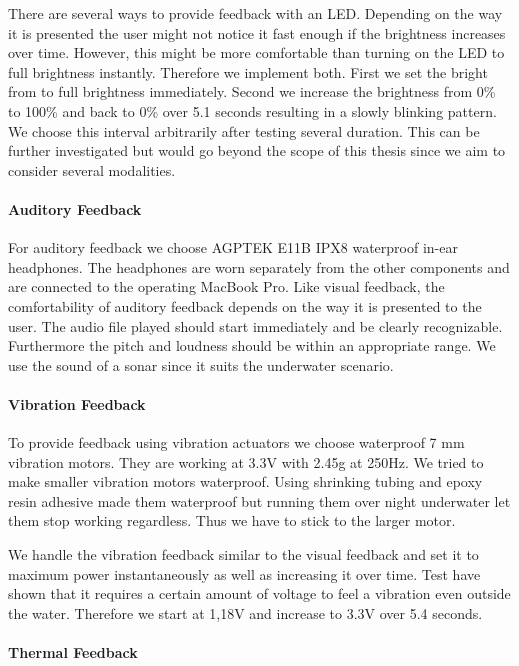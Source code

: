 There are several ways to provide feedback with an LED.
Depending on the way it is presented the user might not notice it fast enough if the brightness increases over time.
However, this might be more comfortable than turning on the LED to full brightness instantly.
Therefore we implement both.
First we set the bright from to full brightness immediately.
Second we increase the brightness from 0\% to 100\%  and back to 0\% over 5.1 seconds resulting in a slowly blinking pattern.
We choose this interval arbitrarily after testing several duration.
This can be further investigated but would go beyond the scope of this thesis since we aim to consider several modalities.


\paragraph{Auditory Feedback}

For auditory feedback we choose AGPTEK E11B IPX8 waterproof in-ear headphones.
The headphones are worn separately from the other components and are connected to the operating MacBook Pro.
Like visual feedback, the comfortability of auditory feedback depends on the way it is presented to the user. 
The audio file played should start immediately and be clearly recognizable.
Furthermore the pitch and loudness should be within an appropriate range.
We use the sound of a sonar since it suits the underwater scenario.


\paragraph{Vibration Feedback}

To provide feedback using vibration actuators we choose waterproof 7 mm vibration motors.
They are working at 3.3V with 2.45g at 250Hz.
We tried to make smaller vibration motors waterproof.
Using shrinking tubing and epoxy resin adhesive made them waterproof but running them over night underwater let them stop working regardless.
Thus we have to stick to the larger motor.

We handle the vibration feedback similar to the visual feedback and set it to maximum power instantaneously as well as increasing it over time.
Test have shown that it requires a certain amount of voltage to feel a vibration even outside the water.
Therefore we start at 1,18V and increase to 3.3V over 5.4 seconds.


\paragraph{Thermal Feedback}


